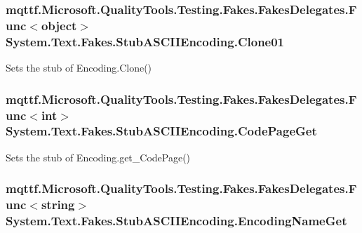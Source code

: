 \hypertarget{class_system_1_1_text_1_1_fakes_1_1_stub_a_s_c_i_i_encoding_aca5502081304b733d696b937f8ad3528}{
\subsubsection[{Clone01}]{\setlength{\rightskip}{0pt plus 5cm}mqttf.\-Microsoft.\-Quality\-Tools.\-Testing.\-Fakes.\-Fakes\-Delegates.\-Func$<$object$>$ System.\-Text.\-Fakes.\-Stub\-A\-S\-C\-I\-I\-Encoding.\-Clone01}}\label{class_system_1_1_text_1_1_fakes_1_1_stub_a_s_c_i_i_encoding_aca5502081304b733d696b937f8ad3528}


Sets the stub of Encoding.\-Clone()

\hypertarget{class_system_1_1_text_1_1_fakes_1_1_stub_a_s_c_i_i_encoding_a3c20c21aaad556c8a8fc7eee1cfd1623}{
\subsubsection[{Code\-Page\-Get}]{\setlength{\rightskip}{0pt plus 5cm}mqttf.\-Microsoft.\-Quality\-Tools.\-Testing.\-Fakes.\-Fakes\-Delegates.\-Func$<$int$>$ System.\-Text.\-Fakes.\-Stub\-A\-S\-C\-I\-I\-Encoding.\-Code\-Page\-Get}}\label{class_system_1_1_text_1_1_fakes_1_1_stub_a_s_c_i_i_encoding_a3c20c21aaad556c8a8fc7eee1cfd1623}


Sets the stub of Encoding.\-get\-\_\-\-Code\-Page()

\hypertarget{class_system_1_1_text_1_1_fakes_1_1_stub_a_s_c_i_i_encoding_a41989ce28a6aff687882bd718f66f1f4}{
\subsubsection[{Encoding\-Name\-Get}]{\setlength{\rightskip}{0pt plus 5cm}mqttf.\-Microsoft.\-Quality\-Tools.\-Testing.\-Fakes.\-Fakes\-Delegates.\-Func$<$string$>$ System.\-Text.\-Fakes.\-Stub\-A\-S\-C\-I\-I\-Encoding.\-Encoding\-Name\-Get}}\label{class_system_1_1_text_1_1_fakes_1_1_stub_a_s_c_i_i_encoding_a41989ce28a6aff687882bd718f66f1f4}


